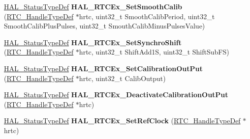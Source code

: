 \begin{DoxyCompactItemize}
\item 
\mbox{\label{group___r_t_c_ex___exported___functions___group3_ga394b6624dbda05ef3e375d83884ba00b}} 
\hyperlink{stm32f4xx__hal__def_8h_a63c0679d1cb8b8c684fbb0632743478f}{H\+A\+L\+\_\+\+Status\+Type\+Def} {\bfseries H\+A\+L\+\_\+\+R\+T\+C\+Ex\+\_\+\+Set\+Smooth\+Calib} (\hyperlink{struct_r_t_c___handle_type_def}{R\+T\+C\+\_\+\+Handle\+Type\+Def} $\ast$hrtc, uint32\+\_\+t Smooth\+Calib\+Period, uint32\+\_\+t Smooth\+Calib\+Plus\+Pulses, uint32\+\_\+t Smouth\+Calib\+Minus\+Pulses\+Value)
\item 
\mbox{\label{group___r_t_c_ex___exported___functions___group3_ga07344e3d0f7e9f569ec02d4a75d158dc}} 
\hyperlink{stm32f4xx__hal__def_8h_a63c0679d1cb8b8c684fbb0632743478f}{H\+A\+L\+\_\+\+Status\+Type\+Def} {\bfseries H\+A\+L\+\_\+\+R\+T\+C\+Ex\+\_\+\+Set\+Synchro\+Shift} (\hyperlink{struct_r_t_c___handle_type_def}{R\+T\+C\+\_\+\+Handle\+Type\+Def} $\ast$hrtc, uint32\+\_\+t Shift\+Add1S, uint32\+\_\+t Shift\+Sub\+FS)
\item 
\mbox{\label{group___r_t_c_ex___exported___functions___group3_gafee5f33f43d10ae0b64aa073412de17e}} 
\hyperlink{stm32f4xx__hal__def_8h_a63c0679d1cb8b8c684fbb0632743478f}{H\+A\+L\+\_\+\+Status\+Type\+Def} {\bfseries H\+A\+L\+\_\+\+R\+T\+C\+Ex\+\_\+\+Set\+Calibration\+Out\+Put} (\hyperlink{struct_r_t_c___handle_type_def}{R\+T\+C\+\_\+\+Handle\+Type\+Def} $\ast$hrtc, uint32\+\_\+t Calib\+Output)
\item 
\mbox{\label{group___r_t_c_ex___exported___functions___group3_ga4cba173360f2993cafdd2c77fc51b7a9}} 
\hyperlink{stm32f4xx__hal__def_8h_a63c0679d1cb8b8c684fbb0632743478f}{H\+A\+L\+\_\+\+Status\+Type\+Def} {\bfseries H\+A\+L\+\_\+\+R\+T\+C\+Ex\+\_\+\+Deactivate\+Calibration\+Out\+Put} (\hyperlink{struct_r_t_c___handle_type_def}{R\+T\+C\+\_\+\+Handle\+Type\+Def} $\ast$hrtc)
\item 
\mbox{\label{group___r_t_c_ex___exported___functions___group3_gad3759b90bbf48597b2797411c72632dc}} 
\hyperlink{stm32f4xx__hal__def_8h_a63c0679d1cb8b8c684fbb0632743478f}{H\+A\+L\+\_\+\+Status\+Type\+Def} {\bfseries H\+A\+L\+\_\+\+R\+T\+C\+Ex\+\_\+\+Set\+Ref\+Clock} (\hyperlink{struct_r_t_c___handle_type_def}{R\+T\+C\+\_\+\+Handle\+Type\+Def} $\ast$hrtc)

\end{DoxyCompactItemize}
